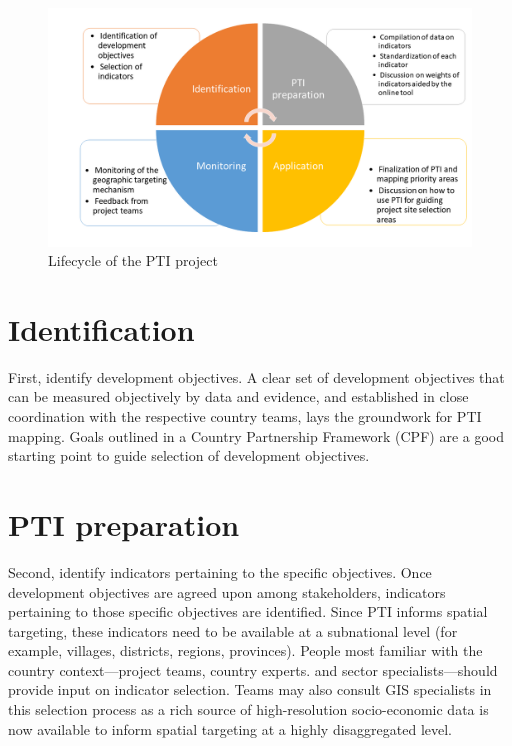 \documentclass[
]{book}
\begin{document}
\begin{figure}
\includegraphics[width=1\linewidth]{figure1/Slide1} \caption{Lifecycle of the PTI project}\label{fig:pressure}
\end{figure}

\hypertarget{identification}{%
\chapter{Identification}\label{identification}}

First, identify development objectives. A clear set of development objectives that can be measured objectively by data and evidence, and established in close coordination with the respective country teams, lays the groundwork for PTI mapping. Goals outlined in a Country Partnership Framework (CPF) are a good starting point to guide selection of development objectives.

\hypertarget{pti-prep}{%
\chapter{PTI preparation}\label{pti-prep}}

Second, identify indicators pertaining to the specific objectives. Once development objectives are agreed upon among stakeholders, indicators pertaining to those specific objectives are identified. Since PTI informs spatial targeting, these indicators need to be available at a subnational level (for example, villages, districts, regions, provinces). People most familiar with the country context---project teams, country experts. and sector specialists---should provide input on indicator selection. Teams may also consult GIS specialists in this selection process as a rich source of high-resolution socio-economic data is now available to inform spatial targeting at a highly disaggregated level.
\end{document}
